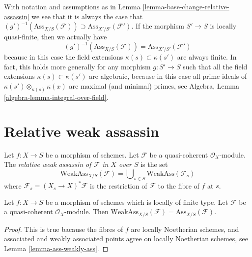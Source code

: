\begin{remark}
\label{remark-base-change-relative-assassin}
With notation and assumptions as in
Lemma \ref{lemma-base-change-relative-assassin}
we see that it is always the case that
$(g')^{-1}(\text{Ass}_{X/S}(\mathcal{F})) \supset
\text{Ass}_{X'/S'}(\mathcal{F}')$.
If the morphism $S' \to S$ is locally quasi-finite, then we actually have
$$
(g')^{-1}(\text{Ass}_{X/S}(\mathcal{F}))
=
\text{Ass}_{X'/S'}(\mathcal{F}')
$$
because in this case the field extensions $\kappa(s) \subset \kappa(s')$
are always finite. In fact, this holds more generally for any morphism
$g : S' \to S$ such that all the field extensions
$\kappa(s) \subset \kappa(s')$ are algebraic, because in this case all
prime ideals of $\kappa(s') \otimes_{\kappa(s)} \kappa(x)$ are
maximal (and minimal) primes, see
Algebra, Lemma \ref{algebra-lemma-integral-over-field}.
\end{remark}




\section{Relative weak assassin}
\label{section-relative-weak-assassin}

\begin{definition}
\label{definition-relative-weak-assassin}
Let $f : X \to S$ be a morphism of schemes.
Let $\mathcal{F}$ be a quasi-coherent $\mathcal{O}_X$-module.
The {\it relative weak assassin of $\mathcal{F}$ in $X$ over $S$}
is the set
$$
\text{WeakAss}_{X/S}(\mathcal{F}) =
\bigcup\nolimits_{s \in S} \text{WeakAss}(\mathcal{F}_s)
$$
where $\mathcal{F}_s = (X_s \to X)^*\mathcal{F}$ is the restriction
of $\mathcal{F}$ to the fibre of $f$ at $s$.
\end{definition}

\begin{lemma}
\label{lemma-relative-weak-assassin-assassin-finite-type}
Let $f : X \to S$ be a morphism of schemes which is locally of finite type.
Let $\mathcal{F}$ be a quasi-coherent $\mathcal{O}_X$-module.
Then $\text{WeakAss}_{X/S}(\mathcal{F}) = \text{Ass}_{X/S}(\mathcal{F})$.
\end{lemma}

\begin{proof}
This is true bacause the fibres of $f$ are locally Noetherian schemes,
and associated and weakly associated points agree on locally Noetherian
schemes, see
Lemma \ref{lemma-ass-weakly-ass}.
\end{proof}





